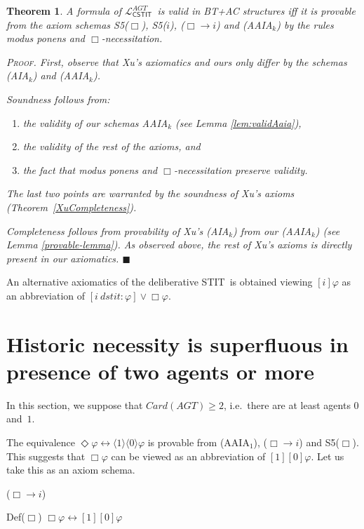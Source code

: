 \documentclass{article}
\newtheorem{theorem}{Theorem}
\newenvironment{pf}{\em \medskip\noindent \textsc{Proof.}}
{\hspace*{\fill}\nolinebreak[2]\hspace*{\fill}$\blacksquare$\medskip}
\renewcommand{\phi}{\varphi}
\newcommand{\card}[1]{\mathit{Card}(#1)}           \newcommand{\ext}[1]{|#1|}
\newcommand{\eqv}{\leftrightarrow}      \newcommand{\imp}{\rightarrow}          \newcommand{\subfml}{\mathit{sf}}
\newcommand{\cstit}[1]{[{#1}]}           \newcommand{\poscstit}[1]{\langle {#1} \rangle}    \newcommand{\dstit}[2]{[{#1}\ \mathit{dstit}\! :{#2}]}
\newcommand{\InclBox}[1]{$\Box \!\! \imp \!\! #1$}
\newcommand{\agtset}{\ensuremath{\mathit{AGT}}}
\newcommand{\STIT} {{\textsf{STIT}}}              \newcommand{\CSTIT}{{\textsf{CSTIT}}}            \newcommand{\DSTIT}{{\textsf{DSTIT}}}
\newcommand{\LCSTIT}{$\mathcal{L}_{\mathsf{CSTIT}}^\agtset$}
\begin{document}
\begin{theorem}
A formula of \LCSTIT\ is valid in BT+AC structures iff it is provable from the
axiom schemas S5($\Box$), S5($i$), (\InclBox{i}) and (AAIA$_k$) by the rules
modus ponens and $\Box$-necessitation.

\begin{pf}
First, observe that Xu's axiomatics and ours only differ by the schemas
(AIA$_k$) and (AAIA$_k$).

Soundness follows from:
\begin{enumerate}
\item the validity of our schemas AAIA$_k$ (see Lemma \ref{lem:validAaia}),
\item the validity of the rest of the axioms, and
\item the fact that modus ponens and $\Box$-necessitation preserve validity.
\end{enumerate}
The last two points are warranted by the soundness of Xu's axioms
(Theorem~\ref{XuCompleteness}).

Completeness follows from provability of Xu's (AIA$_k$) from our (AAIA$_k$)
(see Lemma \ref{provable-lemma}).
As observed above, the rest of Xu's axioms is directly present in our axiomatics.
\end{pf}

\end{theorem}

An alternative axiomatics of the deliberative \STIT\ is obtained viewing
$\cstit{i} \phi$ as an abbreviation of $\dstit{i} \phi \lor \Box \phi$.



\goodbreak
\section{Historic necessity is superfluous
         in presence of two agents or more}\label{sec:unsettling}


In this section, we suppose that $\card{\agtset} \geq 2$, i.e.\
there are at least agents $0$ and~$1$.

The equivalence $\Diamond \phi \eqv \poscstit{1} \poscstit{0} \phi  $
is provable from (AAIA$_1$), (\InclBox{i}) and S5($\Box$).
This suggests that $\Box \phi$ can be viewed as an abbreviation of
$\cstit{1} \cstit{0} \phi $.
Let us take this as an axiom schema.

\begin{itemlist}{(\InclBox{i})}
  \item[Def($\Box$)]
  $\Box \phi \eqv \cstit{1} \cstit{0} \phi $
\end{itemlist}
\end{document}
